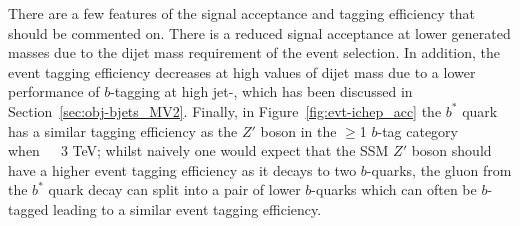 There are a few features of the signal acceptance and tagging efficiency that should be commented on.
There is a reduced signal acceptance at lower generated masses
due to the dijet mass requirement of the event selection. 
In addition, the event tagging efficiency decreases at high values of dijet mass
due to a lower performance of $b$-tagging at high jet-\pT,
which has been discussed in Section~\ref{sec:obj-bjets_MV2}.
Finally, in Figure~\ref{fig:evt-ichep_acc} the $b^*$ quark has a similar tagging efficiency
as the $Z'$ boson in the $\geq$1 $b$-tag category when~\mjj~\gt~3 TeV;
whilst naively one would expect that the SSM $Z'$ boson should have a higher
event tagging efficiency as it decays to two $b$-quarks,
the gluon from the $b^*$ quark decay can split into a pair of lower \pT{} $b$-quarks
which can often be $b$-tagged leading to a similar event tagging efficiency.

